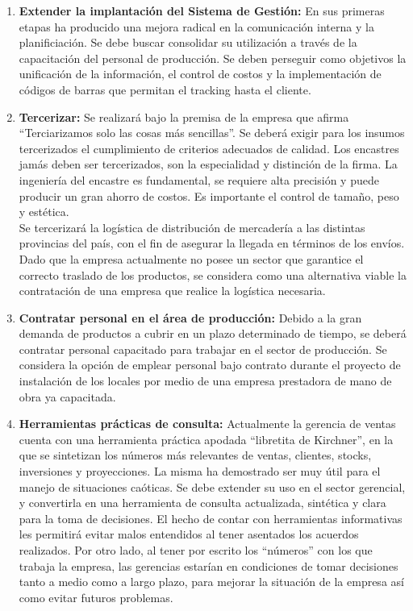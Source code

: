 \documentclass[a4paper,10pt,titlepage]{article}
\begin{document}
\begin{enumerate}
\item \textbf{Extender la implantaci\'on del Sistema de Gesti\'on:} En sus primeras etapas ha producido una mejora radical en la comunicaci\'on interna y la planificiaci\'on. Se debe buscar consolidar su utilizaci\'on a trav\'es de la capacitaci\'on del personal de producci\'on. Se deben perseguir como objetivos la unificaci\'on de la informaci\'on, el control de costos y la implementaci\'on de c\'odigos de barras que permitan el tracking hasta el cliente.

\item \textbf{Tercerizar:} Se realizar\'a bajo la premisa de la empresa que afirma ``Terciarizamos solo las cosas m\'as sencillas''. Se deber\'a exigir para los insumos tercerizados el cumplimiento de criterios adecuados de calidad. Los encastres jam\'as deben ser tercerizados, son la especialidad y distinci\'on de la firma. La ingenier\'ia del encastre es fundamental, se requiere alta precisi\'on y puede producir un gran ahorro de costos. Es importante el control de tama\~no, peso y est\'etica.\\
				Se tercerizar\'a la log\'istica de distribuci\'on de mercader\'ia a las distintas provincias del pa\'is, con el fin de asegurar la llegada en t\'erminos de los env\'ios. Dado que la empresa actualmente no posee un sector que garantice el correcto traslado de los productos, se considera como una alternativa viable la contrataci\'on de una empresa que realice la log\'istica necesaria.

\item \textbf{Contratar personal en el \'area de producci\'on:} Debido a la gran demanda de productos a cubrir en un plazo determinado de tiempo, se deber\'a contratar personal capacitado para trabajar en el sector de producci\'on. Se considera la opci\'on de emplear personal bajo contrato durante el proyecto de instalaci\'on de los locales por medio de una empresa prestadora de mano de obra ya capacitada.

\item \textbf{Herramientas pr\'acticas de consulta:} Actualmente la gerencia de ventas cuenta con una herramienta pr\'actica apodada ``libretita de Kirchner'', en la que se sintetizan los n\'umeros m\'as relevantes de ventas, clientes, stocks, inversiones y proyecciones. La misma ha demostrado ser muy \'util para el manejo de situaciones ca\'oticas. Se debe extender su uso en el sector gerencial, y convertirla en una herramienta de consulta actualizada, sint\'etica y clara para la toma de decisiones. El hecho de contar con herramientas informativas les permitir\'a evitar malos entendidos al tener asentados los acuerdos realizados. Por otro lado, al tener por escrito los ``n\'umeros'' con los que trabaja la empresa, las gerencias estar\'ian en condiciones de tomar decisiones tanto a medio como a largo plazo, para mejorar la situaci\'on de la empresa as\'i como evitar futuros problemas.


\end{enumerate}
\end{document}
